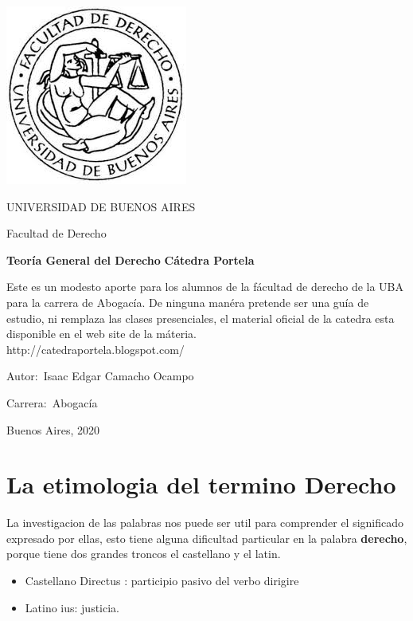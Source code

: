 \documentclass[12pt]{book}
\begin{document}
\thispagestyle{empty}

\begin {center}

\includegraphics[scale=.4]{descarga.jpeg}

\medskip
UNIVERSIDAD DE BUENOS AIRES

Facultad de Derecho


\vspace{3cm}

\textbf{\large Teor\'ia General del Derecho}
\textbf{\large C\'atedra Portela}
\vspace{2cm}


Este es un modesto aporte para los alumnos de la f\'acultad de derecho de la UBA para la carrera de Abogac\'ia.
De ninguna man\'era pretende ser una gu\'ia de estudio, ni remplaza las clases presenciales, el material oficial de la catedra esta disponible en el web site de la m\'ateria.
\\
http://catedraportela.blogspot.com/

\end {center}


\vspace{2.5cm}

\noindent Autor:\,	Isaac Edgar Camacho Ocampo
 
\noindent Carrera:\,	Abogac\'ia

\vspace{1cm}

\vspace{1cm}

\noindent Buenos Aires, 2020

\newpage


\tableofcontents
\chapter{La etimologia del termino Derecho}
La investigacion de las palabras nos puede ser util para comprender el significado expresado por ellas, esto tiene alguna dificultad particular en la palabra \textbf{derecho}, porque tiene dos grandes troncos el castellano y el latin.
\begin{itemize}
\item Castellano Directus : participio pasivo del verbo dirigire
\item Latino ius: justicia.
\end{itemize}
\end{document}
